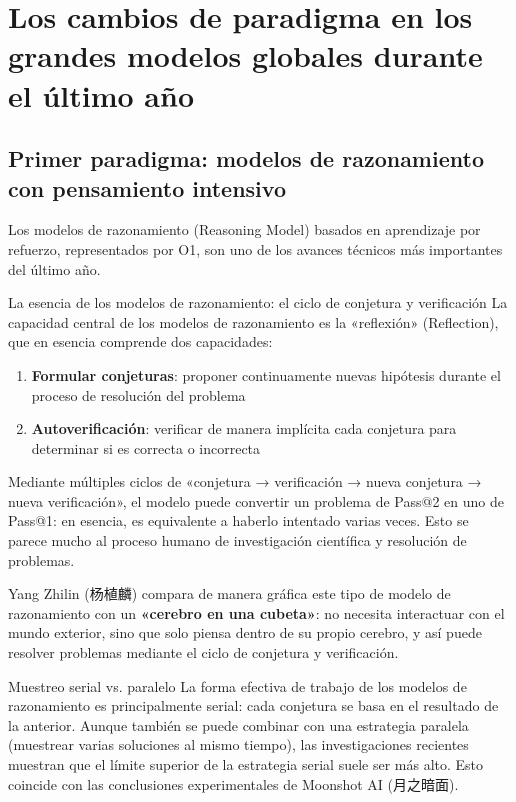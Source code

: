 \documentclass[a4paper]{article}
\begin{document}
\section{Los cambios de paradigma en los grandes modelos globales durante el último año}

\subsection{Primer paradigma: modelos de razonamiento con pensamiento intensivo}

Los modelos de razonamiento (Reasoning Model) basados en aprendizaje por refuerzo, representados por O1, son uno de los avances técnicos más importantes del último año.

\begin{importantbox}{La esencia de los modelos de razonamiento: el ciclo de conjetura y verificación}
La capacidad central de los modelos de razonamiento es la «reflexión» (Reflection), que en esencia comprende dos capacidades:
\begin{enumerate}
    \item \textbf{Formular conjeturas}: proponer continuamente nuevas hipótesis durante el proceso de resolución del problema
    \item \textbf{Autoverificación}: verificar de manera implícita cada conjetura para determinar si es correcta o incorrecta
\end{enumerate}
Mediante múltiples ciclos de «conjetura → verificación → nueva conjetura → nueva verificación», el modelo puede convertir un problema de Pass@2 en uno de Pass@1: en esencia, es equivalente a haberlo intentado varias veces. Esto se parece mucho al proceso humano de investigación científica y resolución de problemas.
\end{importantbox}

Yang Zhilin (杨植麟) compara de manera gráfica este tipo de modelo de razonamiento con un \textbf{«cerebro en una cubeta»}: no necesita interactuar con el mundo exterior, sino que solo piensa dentro de su propio cerebro, y así puede resolver problemas mediante el ciclo de conjetura y verificación.

\begin{knowledgebox}{Muestreo serial vs. paralelo}
La forma efectiva de trabajo de los modelos de razonamiento es principalmente serial: cada conjetura se basa en el resultado de la anterior. Aunque también se puede combinar con una estrategia paralela (muestrear varias soluciones al mismo tiempo), las investigaciones recientes muestran que el límite superior de la estrategia serial suele ser más alto. Esto coincide con las conclusiones experimentales de Moonshot AI (月之暗面).
\end{knowledgebox}
\end{document}
